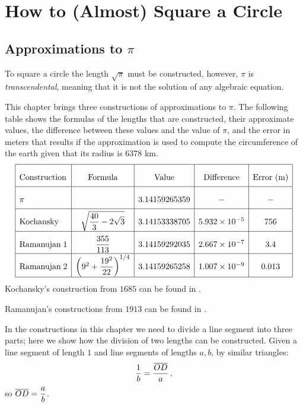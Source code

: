 
\chapter{How to (Almost) Square a Circle}\label{c.squaring}

\section{Approximations to $\pi$}\label{s.square-intro}

To square a circle the length $\sqrt{\pi}$ must be constructed, however, $\pi$ is \emph{transcendental}, meaning that it is not the solution of any algebraic equation.

This chapter brings three constructions of approximations to $\pi$. The following table shows the formulas of the lengths that are constructed, their approximate values, the difference between these values and the value of $\pi$, and the error in meters that results if the approximation is used to compute the circumference of the earth given that its radius is $6378$ km.
\[
\renewcommand{\arraystretch}{2.2}
\begin{array}{|l|c|c|c|c|}
\hline
\textrm{Construction} & \textrm{Formula} &\textrm{Value} & \textrm{Difference} & \textrm{Error (m)}\\\hline
\pi & & 3.14159265359 & - & -\\\hline
\textrm{Kochansky} & \sqrt{\disfrac{40}{3}-2\sqrt{3}}&
  3.14153338705 & 5.932 \times 10^{-5} & 756\\\hline
\textrm{Ramanujan}\; 1 & \disfrac{355}{113} &
  3.14159292035 &2.667  \times 10^{-7}&3.4\\\hline
\textrm{Ramanujan}\; 2 &\left(9^2+\disfrac{19^2}{22}\right)^{1/4}&
  3.14159265258 & 1.007 \times 10^{-9}& 0.013\\\hline
\end{array}
\]
Kochansky's construction from $1685$ can be found in \cite{bold}.

Ramanujan's constructions from $1913$ can be found in \cite{ramanujan1,ramanujan2}.

In the constructions in this chapter we need to divide a line segment into three parts; here we show how the division of two lengths can be constructed. Given a line segment of length $1$ and line segments of lengths $a,b$, by similar triangles:
\[
\displaystyle\frac{1}{b}=\displaystyle\frac{\overline{OD}}{a}\,,
\]
so $\overline{OD}=\displaystyle\frac{a}{b}$.

